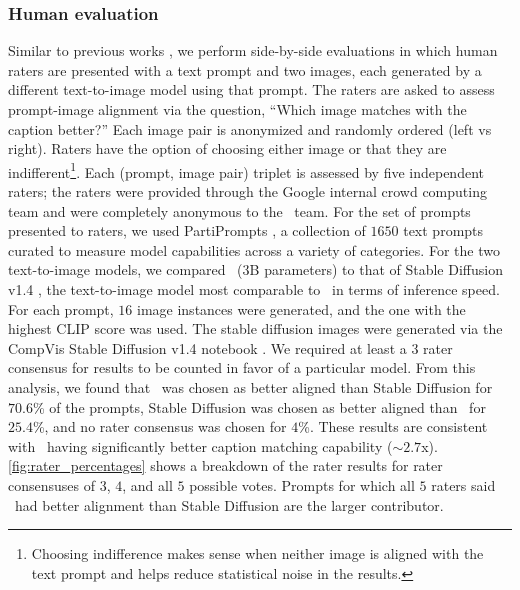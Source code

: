\subsubsection{Human evaluation}

Similar to previous works \citep{parti, imagen}, we perform side-by-side evaluations in which human raters are presented with a text prompt and two images, each generated by a different text-to-image model using that prompt. The raters are asked to assess prompt-image alignment via the question, ``Which image matches with the caption better?'' Each image pair is anonymized and randomly ordered (left vs right). Raters have the option of choosing either image or that they are indifferent\footnote{Choosing indifference makes sense when neither image is aligned with the text prompt and helps reduce statistical noise in the results.}. Each (prompt, image pair) triplet is assessed by five independent raters; the raters were provided through the Google internal crowd computing team and were completely anonymous to the \name~team. For the set of prompts presented to raters, we used PartiPrompts \citep{parti}, a collection of $1650$ text prompts curated to measure model capabilities across a variety of categories. For the two text-to-image models, we compared \name~($3$B parameters) to that of Stable Diffusion v1.4 \citep{ldm}, the text-to-image model most comparable to \name~in terms of inference speed. For each prompt, $16$ image instances were generated, and the one with the highest CLIP score \citep{clip} was used. The stable diffusion images were generated via the CompVis Stable Diffusion v1.4 notebook \citep{sdgeneration}. We required at least a $3$ rater consensus for results to be counted in favor of a particular model. From this analysis, we found that \name~was chosen as better aligned than Stable Diffusion for $70.6$\% of the prompts, Stable Diffusion was chosen as better aligned than \name~for $25.4$\%, and no rater consensus was chosen for $4$\%. These results are consistent with \name~having significantly better caption matching capability ($\sim\!2.7$x). \cref{fig:rater_percentages} shows a breakdown of the rater results for rater consensuses of $3$, $4$, and all $5$ possible votes. Prompts for which all $5$ raters said \name~had better alignment than Stable Diffusion are the larger contributor.

